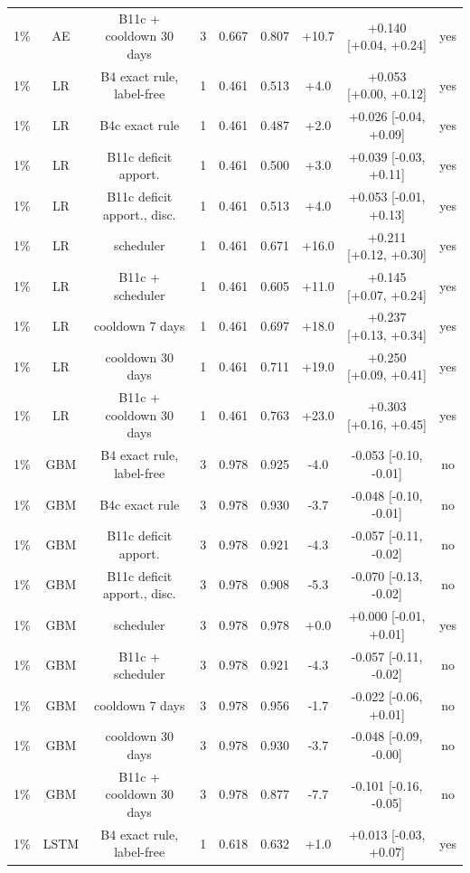 \documentclass[10pt,onecolumn,letterpaper]{article}
\begin{document}
\begin{table}[!t]
{\begin{tabular}{lcccccccc}
1\% & AE & B11c + cooldown 30 days & 3 & 0.667 & 0.807 & +10.7 & +0.140 [+0.04, +0.24] & yes \\
1\% & LR & B4 exact rule, label-free & 1 & 0.461 & 0.513 & +4.0 & +0.053 [+0.00, +0.12] & yes \\
1\% & LR & B4c exact rule & 1 & 0.461 & 0.487 & +2.0 & +0.026 [-0.04, +0.09] & yes \\
1\% & LR & B11c deficit apport. & 1 & 0.461 & 0.500 & +3.0 & +0.039 [-0.03, +0.11] & yes \\
1\% & LR & B11c deficit apport., disc. & 1 & 0.461 & 0.513 & +4.0 & +0.053 [-0.01, +0.13] & yes \\
1\% & LR & scheduler & 1 & 0.461 & 0.671 & +16.0 & +0.211 [+0.12, +0.30] & yes \\
1\% & LR & B11c + scheduler & 1 & 0.461 & 0.605 & +11.0 & +0.145 [+0.07, +0.24] & yes \\
1\% & LR & cooldown 7 days & 1 & 0.461 & 0.697 & +18.0 & +0.237 [+0.13, +0.34] & yes \\
1\% & LR & cooldown 30 days & 1 & 0.461 & 0.711 & +19.0 & +0.250 [+0.09, +0.41] & yes \\
1\% & LR & B11c + cooldown 30 days & 1 & 0.461 & 0.763 & +23.0 & +0.303 [+0.16, +0.45] & yes \\
1\% & GBM & B4 exact rule, label-free & 3 & 0.978 & 0.925 & -4.0 & -0.053 [-0.10, -0.01] & no \\
1\% & GBM & B4c exact rule & 3 & 0.978 & 0.930 & -3.7 & -0.048 [-0.10, -0.01] & no \\
1\% & GBM & B11c deficit apport. & 3 & 0.978 & 0.921 & -4.3 & -0.057 [-0.11, -0.02] & no \\
1\% & GBM & B11c deficit apport., disc. & 3 & 0.978 & 0.908 & -5.3 & -0.070 [-0.13, -0.02] & no \\
1\% & GBM & scheduler & 3 & 0.978 & 0.978 & +0.0 & +0.000 [-0.01, +0.01] & yes \\
1\% & GBM & B11c + scheduler & 3 & 0.978 & 0.921 & -4.3 & -0.057 [-0.11, -0.02] & no \\
1\% & GBM & cooldown 7 days & 3 & 0.978 & 0.956 & -1.7 & -0.022 [-0.06, +0.01] & no \\
1\% & GBM & cooldown 30 days & 3 & 0.978 & 0.930 & -3.7 & -0.048 [-0.09, -0.00] & no \\
1\% & GBM & B11c + cooldown 30 days & 3 & 0.978 & 0.877 & -7.7 & -0.101 [-0.16, -0.05] & no \\
1\% & LSTM & B4 exact rule, label-free & 1 & 0.618 & 0.632 & +1.0 & +0.013 [-0.03, +0.07] & yes \\

\end{tabular}}
\end{table}
\end{document}
